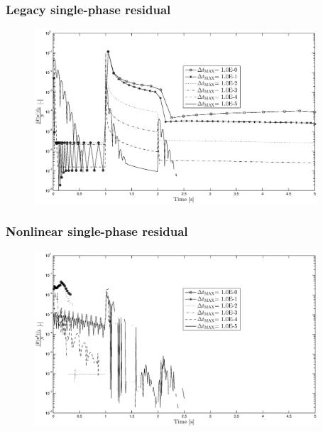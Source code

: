 \documentclass[compress,xcolor=table]{beamer}
\begin{document}
\begin{frame}
\frametitle{Legacy single-phase residual}

\begin{figure}[h!t]
\centering
\includegraphics[width=0.94\textwidth]{images/single_semilogy_res_v_dt_lin.eps}
\end{figure}

\end{frame}
\begin{frame}
\frametitle{Nonlinear single-phase residual}

\begin{figure}[h!t]
\centering
\includegraphics[width=0.94\textwidth]{images/single_semilogy_res_v_dt_nl.eps}
\end{figure}
\end{frame}
\end{document}
